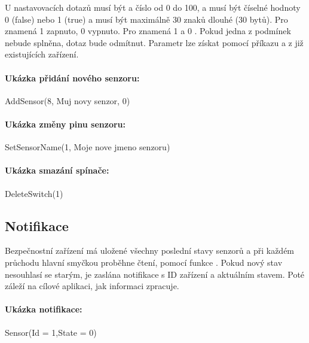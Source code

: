 \documentclass[FM,DP]{tulthesis}  %
\begin{document}
U nastavovacích dotazů musí být  a  číslo od 0 do 100,  a  musí být číselné hodnoty 0 (false) nebo 1 (true) a  musí být maximálně 30 znaků dlouhé (30 bytů). Pro  znamená 1 zapnuto, 0 vypnuto. Pro  znamená 1  a 0 . Pokud jedna z podmínek nebude splněna, dotaz bude odmítnut. Parametr  lze získat pomocí příkazu  a  z již existujících zařízení.

\paragraph{Ukázka přidání nového senzoru:}
\begin{center}
AddSensor(8, Muj novy senzor, 0)
\end{center}

\paragraph{Ukázka změny pinu senzoru:}
\begin{center}
SetSensorName(1, Moje nove jmeno senzoru)
\end{center}

\paragraph{Ukázka smazání spínače:}
\begin{center}
DeleteSwitch(1)
\end{center}

\subsection{Notifikace}
Bezpečnostní zařízení má uložené všechny poslední stavy senzorů a při každém průchodu hlavní smyčkou proběhne čtení, pomocí funkce . Pokud nový stav nesouhlasí se starým, je zaslána notifikace s ID zařízení a aktuálním stavem. Poté záleží na cílové aplikaci, jak informaci zpracuje.

\paragraph{Ukázka notifikace:}
\begin{center}
Sensor(Id = 1,State = 0)
\end{center} 
\end{document}
